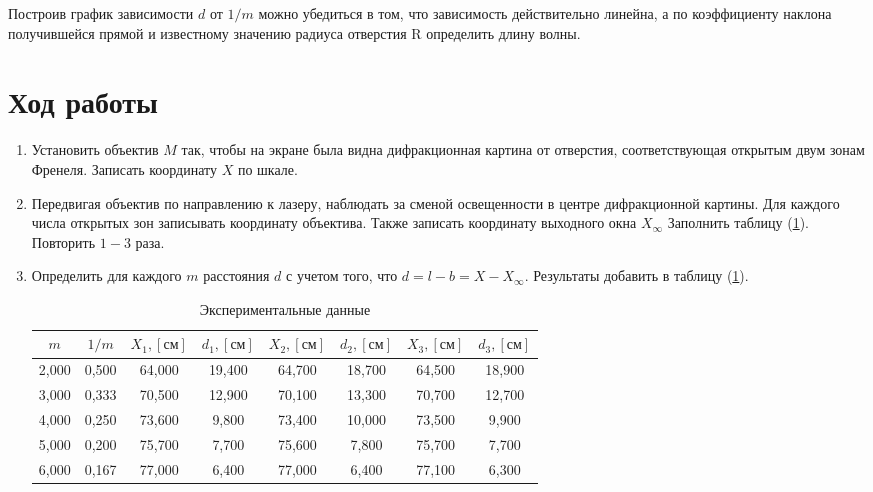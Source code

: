 \documentclass[12pt]{article}
\let\oldref\ref
\renewcommand{\ref}[1]{(\oldref{#1})}
\begin{document}
    Построив график зависимости $ d $ от $ 1/m $ можно убедиться в том, что зависимость действительно линейна, а по коэффициенту наклона получившейся прямой и известному значению радиуса отверстия R определить длину волны.

    \section*{Ход работы}

    \begin{enumerate}[wide, labelwidth=!, labelindent=0pt]
        \item Установить объектив $ M $ так, чтобы на экране была видна дифракционная картина от отверстия, соответствующая открытым двум зонам Френеля. Записать координату $ X $ по шкале.
        \item Передвигая объектив по направлению к лазеру, наблюдать за сменой освещенности в центре дифракционной картины. Для каждого числа открытых зон записывать координату объектива. Также записать координату выходного окна $ X_\infty $ Заполнить таблицу \ref{tab:1}. Повторить $ 1-3 $ раза. 
        
        \item Определить для каждого $ m $ расстояния $ d $ с учетом того, что $ d = l - b = X - X_\infty $. Результаты добавить в таблицу \ref{tab:1}.
        \begin{table}[h!]
            \caption{Экспериментальные данные}
            \label{tab:1}
            \centering
            \begin{tabular}{|c|c|c|c|c|c|c|c|}
                \hline
                $ m $   &   $ 1/m $ &   $ X_1, [см]$ & $ d_1, [см] $ &   $ X_2, [см] $ & $ d_2, [см] $ &   $ X_3, [см] $ & $ d_3, [см] $ \\
                \hline
                2,000 & 0,500 & 64,000 & 19,400 & 64,700 & 18,700 & 64,500 & 18,900\\ 
 \hline 
3,000 & 0,333 & 70,500 & 12,900 & 70,100 & 13,300 & 70,700 & 12,700\\ 
 \hline 
4,000 & 0,250 & 73,600 & 9,800 & 73,400 & 10,000 & 73,500 & 9,900\\ 
 \hline 
5,000 & 0,200 & 75,700 & 7,700 & 75,600 & 7,800 & 75,700 & 7,700\\ 
 \hline 
6,000 & 0,167 & 77,000 & 6,400 & 77,000 & 6,400 & 77,100 & 6,300\\ 
 \hline 
         

\end{tabular}
\end{table}
\end{enumerate}
\end{document}
